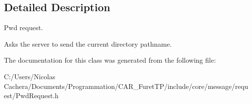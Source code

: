 \subsection{Detailed Description}
Pwd request. 

Asks the server to send the current directory pathname. 

The documentation for this class was generated from the following file\+:\begin{DoxyCompactItemize}
\item 
C\+:/\+Users/\+Nicolas Cachera/\+Documents/\+Programmation/\+C\+A\+R\+\_\+\+Furet\+T\+P/include/core/message/request/Pwd\+Request.\+h\end{DoxyCompactItemize}

